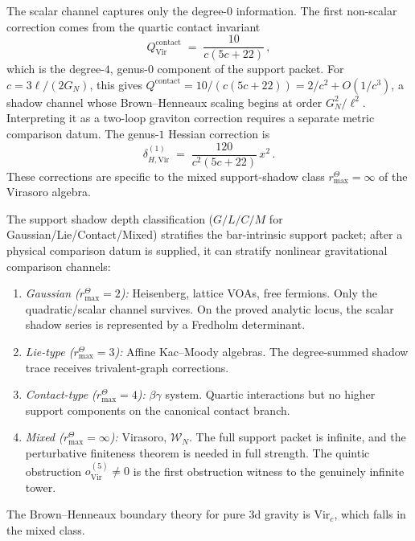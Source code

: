 \begin{remark}
The scalar channel captures only the degree-$0$ information. The first non-scalar correction comes from the quartic contact invariant
\begin{equation}%
Q^{\mathrm{contact}}_{\mathrm{Vir}} \;=\; \frac{10}{c(5c+22)}\,,
\end{equation}
which is the degree-$4$, genus-$0$ component of the support packet. For $c = 3\ell/(2G_N)$, this gives $Q^{\mathrm{contact}} = 10/(c(5c+22)) = 2/c^2 + O(1/c^3)$, a shadow channel whose Brown--Henneaux scaling begins at order $G_N^2/\ell^2$. Interpreting it as a two-loop graviton correction requires a separate metric comparison datum. The genus-$1$ Hessian correction is
\begin{equation}%
\delta_{H,\mathrm{Vir}}^{(1)} \;=\; \frac{120}{c^2(5c+22)}\,x^2\,.
\end{equation}
These corrections are specific to the mixed support-shadow class
\(r^\Theta_{\max}=\infty\) of the Virasoro algebra.
\end{remark}

\begin{remark}
The support shadow depth classification ($G/L/C/M$ for Gaussian/Lie/Contact/Mixed) stratifies the bar-intrinsic support packet; after a physical comparison datum is supplied, it can stratify nonlinear gravitational comparison channels:
\begin{enumerate}[label=\textup{(\alph*)}]
\item \emph{Gaussian (\(r^\Theta_{\max}=2\)):} Heisenberg, lattice VOAs, free fermions. Only the quadratic/scalar channel survives. On the proved analytic locus, the scalar shadow series is represented by a Fredholm determinant.
\item \emph{Lie-type (\(r^\Theta_{\max}=3\)):} Affine Kac--Moody algebras. The degree-summed shadow trace receives trivalent-graph corrections.
\item \emph{Contact-type (\(r^\Theta_{\max}=4\)):} $\beta\gamma$ system. Quartic interactions but no higher support components on the canonical contact branch.
\item \emph{Mixed (\(r^\Theta_{\max}=\infty\)):} Virasoro, $\mathcal{W}_N$. The full support packet is infinite, and the perturbative finiteness theorem is needed in full strength. The quintic obstruction \(o^{(5)}_{\mathrm{Vir}}\neq0\) is the first obstruction witness to the genuinely infinite tower.
\end{enumerate}
The Brown--Henneaux boundary theory for pure 3d gravity is $\mathrm{Vir}_c$, which falls in the mixed class.
\end{remark}

